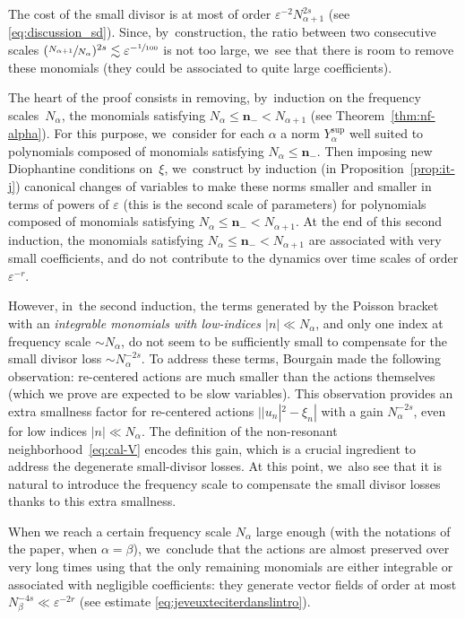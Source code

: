 \documentclass[10pt,a4paper]{amsart}
\theoremstyle{plain}
\theoremstyle{definition}
\newcommand{\nb}{{\boldsymbol n}}
\newcommand{\1}{\mathbf{1}}
\newcommand{\Ysup}[1]{Y_{#1}^{\mathrm{sup}}}
\let\epsilon\varepsilon
\begin{document}
The cost of the small divisor is at most of order $\varepsilon^{-2}N_{\alpha+1}^{2s}$ (see \eqref{eq:discussion_sd}). Since, by~construction, the ratio between two consecutive scales $(\sfrac{N_{\alpha+1}}{N_{\alpha}})^{2s}\lesssim \epsilon^{-\sfrac{1}{100}}$ is not too large, we~see that there is room to remove these monomials (they could be associated to quite large coefficients).

The heart of the proof consists in removing, by~induction on the frequency scales~$N_{\alpha}$, the monomials satisfying $N_{\alpha} \leq \nb_{-} < N_{\alpha+1}$ (see Theorem~\ref{thm:nf-alpha}). For this purpose, we~consider for each $\alpha$ a norm $\Ysup{\alpha}$ well suited to polynomials composed of monomials satisfying $N_{\alpha}\leq \nb_{-}$.
Then imposing new Diophantine conditions on~$\xi$, we~construct by induction (in Proposition~\ref{prop:it-j}) canonical changes of variables to make these norms smaller and smaller in terms of powers of $\varepsilon$ (this is the second scale of parameters) for polynomials composed of monomials satisfying $N_{\alpha} \leq \nb_{-} < N_{\alpha+1}$. At the end of this second induction, the monomials satisfying $N_{\alpha} \leq \nb_{-} < N_{\alpha+1}$ are associated with very small coefficients, and do not contribute to the dynamics over time scales of order $\epsilon^{-r}$.

However, in~the second induction, the terms generated by the Poisson bracket with an \emph{integrable monomials with low-indices $|n|\ll N_{\alpha}$}, and only one index at frequency scale $\sim N_{\alpha}$, do not seem to be sufficiently small to compensate for the small divisor loss $\sim N_{\alpha}^{-2s}$. To address these terms, Bourgain made the following observation: re-centered actions are much smaller than the actions themselves (which we prove are expected to be slow variables). This observation provides an extra smallness factor for re-centered actions $||u_{n}|^{2}-\xi_n|$ with a gain $N_{\alpha}^{-2s}$, even for low indices $|n|\ll N_{\alpha}$. The definition of the non-resonant neighborhood~\eqref{eq:cal-V} encodes this gain, which is a crucial ingredient to address the degenerate small-divisor losses. At this point, we~also see that it is natural to introduce the frequency scale to compensate the small divisor losses thanks to this extra smallness.

When we reach a certain frequency scale $N_{\alpha}$ large enough (with the notations of the paper, when $\alpha=\beta$), we~conclude that the actions are almost preserved over very long times using that the only remaining monomials are either integrable or associated with negligible coefficients: they generate vector fields of order at most $N_\beta^{-4s} \ll \varepsilon^{-2r}$ (see estimate \eqref{eq:jeveuxteciterdanslintro}).\enlargethispage{.5\baselineskip}%
\end{document}
